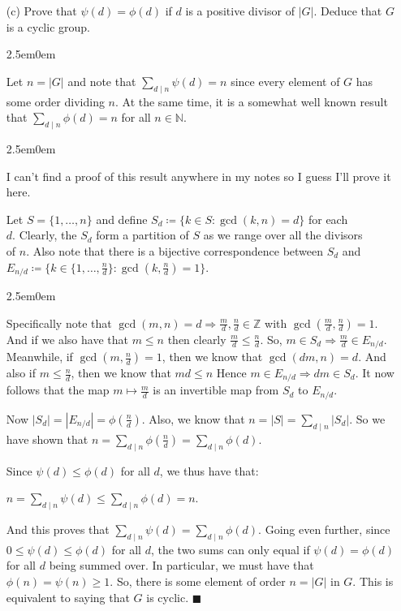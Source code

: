 \documentclass{book}
\newcommand{\HexOne}{%
   \color{Purple}%
   \fontsize{12}{13}\selectfont%
}
\newcommand{\HexTwoP}{%
   \color{RedViolet}%
   \fontsize{12}{13}\selectfont%
}
\newcommand{\HexPPP}{%
   \color{VioletRed}%
   \fontsize{11}{12}\selectfont%
}
\newenvironment{myIndent}{%
   \begin{adjustwidth}{2.5em}{0em}%
}{%
   \end{adjustwidth}%
}
\newcommand{\divides}{\mathop{\mid}}
\newcommand{\retTwo}{\hfill\bigbreak}
\begin{document}
\begin{enumerate}
	\item[(c)] Prove that $\psi(d) = \phi(d)$ if $d$ is a positive divisor of $|G|$. Deduce that $G$ is a cyclic group.
	
	\begin{myIndent}\HexOne
		Let $n = |G|$ and note that $\sum_{d \divides n} \psi(d) = n$ since every element of $G$ has some order dividing $n$. At the same time, it is a somewhat well known result that $\sum_{d \divides n} \phi(d) = n$ for all $n \in \mathbb{N}$.
		\begin{myIndent}\HexTwoP
			I can't find a proof of this result anywhere in my notes so I guess I'll prove it here.\retTwo

			Let $S = \{1, \ldots, n\}$ and define $S_d \coloneqq \{k \in S : \gcd(k, n) = d\}$ for each\\ $d$. Clearly, the $S_d$ form a partition of $S$ as we range over all the divisors\\ of $n$. Also note that there is a bijective correspondence between $S_d$ and\\ $E_{n/d} \coloneqq \{k \in \{1, \ldots, \frac{n}{d}\} : \gcd(k, \frac{n}{d}) = 1\}$.
			\begin{myIndent}\HexPPP
				Specifically note that $\gcd(m, n) = d \Longrightarrow \frac{m}{d}, \frac{n}{d} \in \mathbb{Z}$ with $\gcd(\frac{m}{d}, \frac{n}{d}) = 1$. And if we also have that $m \leq n$ then clearly $\frac{m}{d} \leq \frac{n}{d}$. So, $m \in S_d \Longrightarrow \frac{m}{d} \in E_{n/d}$. Meanwhile, if $\gcd(m, \frac{n}{d}) = 1$, then we know that $\gcd(dm, n) = d$. And also if $m \leq \frac{n}{d}$, then we know that $md \leq n$ Hence $m \in E_{n/d} \Longrightarrow dm \in S_d$. It now follows that the map $m \mapsto \frac{m}{d}$ is an invertible map from $S_d$ to $E_{n/d}$.\retTwo
			\end{myIndent}

			Now $|S_d| = |E_{n/d}| = \phi(\frac{n}{d})$. Also, we know that $n = |S| = \sum_{d \divides n} |S_d|$. So we have shown that $n = \sum_{d \divides n} \phi(\frac{n}{d}) = \sum_{d \divides n} \phi(d)$.\retTwo
		\end{myIndent}

		Since $\psi(d) \leq \phi(d)$ for all $d$, we thus have that:

		{\centering $n = \sum_{d \divides n} \psi(d) \leq \sum_{d \divides n} \phi(d) = n$.\retTwo\par}

		And this proves that $\sum_{d \divides n} \psi(d) = \sum_{d \divides n} \phi(d)$. Going even further, since\\ $0 \leq \psi(d) \leq \phi(d)$ for all $d$, the two sums can only equal if $\psi(d) = \phi(d)$ for all $d$ being summed over. In particular, we must have that $\phi(n) = \psi(n) \geq 1$. So, there is some element of order $n = |G|$ in $G$. This is equivalent to saying that $G$ is cyclic. $\blacksquare$\retTwo
	\end{myIndent}
\end{enumerate}
\end{document}
